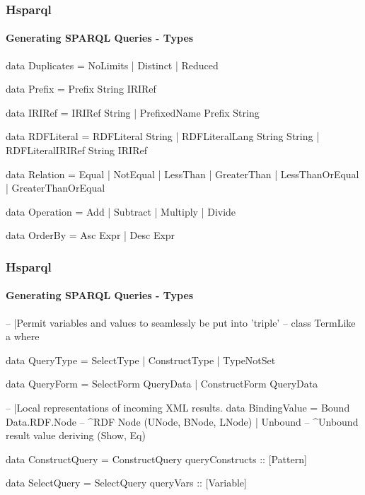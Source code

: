 \documentclass{beamer}
\begin{document}
\begin{frame}[fragile]
\frametitle{Hsparql}
\framesubtitle{Generating SPARQL Queries - Types}

\begin{haskellcode}
data Duplicates = NoLimits | Distinct | Reduced

data Prefix = Prefix String IRIRef

data IRIRef = IRIRef String
            | PrefixedName Prefix String 

data RDFLiteral = RDFLiteral String
                | RDFLiteralLang String String
                | RDFLiteralIRIRef String IRIRef

data Relation = Equal | NotEqual | LessThan | GreaterThan
       | LessThanOrEqual | GreaterThanOrEqual

data Operation = Add | Subtract | Multiply | Divide

data OrderBy = Asc Expr
             | Desc Expr
\end{haskellcode}

\end{frame}

\begin{frame}[fragile]
\frametitle{Hsparql}
\framesubtitle{Generating SPARQL Queries - Types}

\begin{haskellcode}
-- |Permit variables and values to seamlessly be put into 'triple'
-- class TermLike a where

data QueryType = SelectType | ConstructType | TypeNotSet

data QueryForm = SelectForm QueryData | ConstructForm QueryData

-- |Local representations of incoming XML results.
data BindingValue = Bound Data.RDF.Node    -- ^RDF Node (UNode, BNode, LNode)
                  | Unbound       -- ^Unbound result value
  deriving (Show, Eq)


data ConstructQuery = ConstructQuery
    { queryConstructs :: [Pattern] }

data SelectQuery = SelectQuery
    { queryVars :: [Variable] }
\end{haskellcode}

\end{frame}
\end{document}
